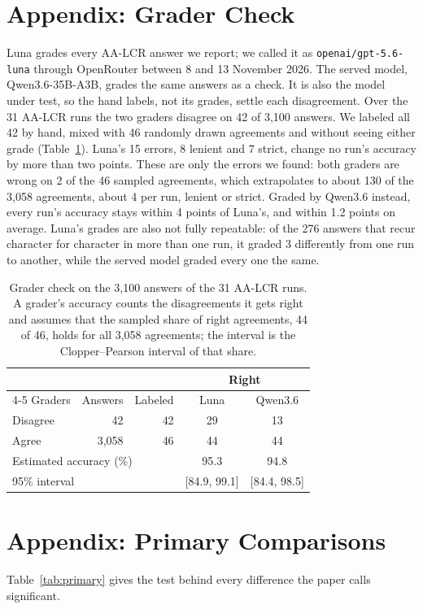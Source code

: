 \documentclass[letterpaper]{article} %
\begin{document}
\section{Appendix: Grader Check}
Luna grades every AA-LCR answer we report; we called it as \texttt{openai/gpt-5.6-luna} through OpenRouter between 8 and 13 November 2026. The served model, Qwen3.6-35B-A3B, grades the same answers as a check. It is also the model under test, so the hand labels, not its grades, settle each disagreement. Over the 31 AA-LCR runs the two graders disagree on 42 of 3,100 answers. We labeled all 42 by hand, mixed with 46 randomly drawn agreements and without seeing either grade (Table~\ref{tab:grader}). Luna's 15 errors, 8 lenient and 7 strict, change no run's accuracy by more than two points. These are only the errors we found: both graders are wrong on 2 of the 46 sampled agreements, which extrapolates to about 130 of the 3,058 agreements, about 4 per run, lenient or strict. Graded by Qwen3.6 instead, every run's accuracy stays within 4 points of Luna's, and within 1.2 points on average. Luna's grades are also not fully repeatable: of the 276 answers that recur character for character in more than one run, it graded 3 differently from one run to another, while the served model graded every one the same.

\begin{table}[t]
\centering
\small
\setlength{\tabcolsep}{4pt}
\begin{tabular}{lrrcc}
\toprule
 & & & \multicolumn{2}{c}{Right} \\
\cmidrule(lr){4-5}
Graders & Answers & Labeled & Luna & Qwen3.6 \\
\midrule
Disagree & 42 & 42 & 29 & 13 \\
Agree & 3,058 & 46 & 44 & 44 \\
\midrule
\multicolumn{3}{l}{Estimated accuracy (\%)} & 95.3 & 94.8 \\
\multicolumn{3}{l}{95\% interval} & [84.9, 99.1] & [84.4, 98.5] \\
\bottomrule
\end{tabular}
\caption{Grader check on the 3,100 answers of the 31 AA-LCR runs. A grader's accuracy counts the disagreements it gets right and assumes that the sampled share of right agreements, 44 of 46, holds for all 3,058 agreements; the interval is the Clopper--Pearson interval of that share.}
\label{tab:grader}
\end{table}

\section{Appendix: Primary Comparisons}
Table~\ref{tab:primary} gives the test behind every difference the paper calls significant.
\end{document}
